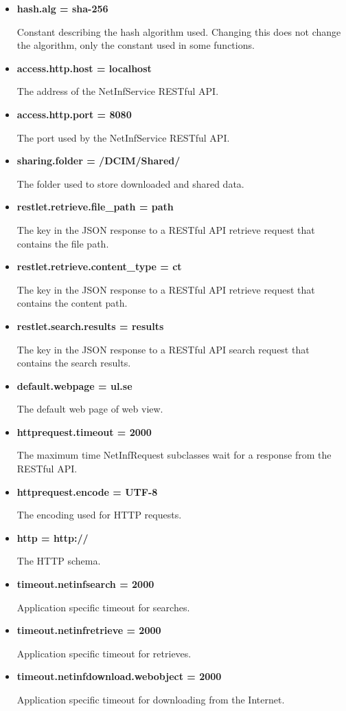 \begin{itemize}
	\item {\bf hash.alg = sha-256}
	
	Constant describing the hash algorithm used. Changing this does not change the algorithm, only the constant used in some functions.
	
	\item {\bf access.http.host = localhost}
	
	The address of the NetInfService RESTful API.
	
	\item {\bf access.http.port = 8080}
	
	The port used by the NetInfService RESTful API.
	
	\item {\bf sharing.folder = /DCIM/Shared/}
	
	The folder used to store downloaded and shared data.
	
	\item {\bf restlet.retrieve.file\_path = path}
	
	The key in the JSON response to a RESTful API retrieve request that contains the file path.
	
	\item {\bf restlet.retrieve.content\_type = ct}
	
	The key in the JSON response to a RESTful API retrieve request that contains the content path.
	
	\item {\bf restlet.search.results = results}
	
	The key in the JSON response to a RESTful API search request that contains the search results.
	
	\item {\bf default.webpage = ul.se}
	
	The default web page of web view.
	
	\item {\bf httprequest.timeout = 2000}
	
	The maximum time NetInfRequest subclasses wait for a response from the RESTful API.
	
	\item {\bf httprequest.encode = UTF-8}
	
	The encoding used for HTTP requests.
	
	\item {\bf http = http://}
	
	The HTTP schema.
	
	\item {\bf timeout.netinfsearch = 2000}
	
	Application specific timeout for searches.
	
	\item {\bf timeout.netinfretrieve = 2000}
	
	Application specific timeout for retrieves.
	
	\item {\bf timeout.netinfdownload.webobject = 2000}
	
	Application specific timeout for downloading from the Internet.
	
\end{itemize}

